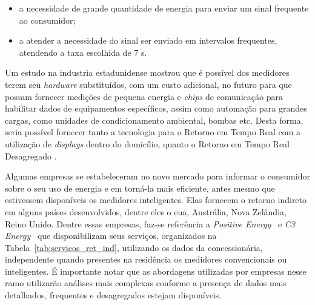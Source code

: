 \begin{itemize}
\item a necessidade de grande quantidade de energia para enviar
um sinal frequente ao consumidor;
\item a atender a necessidade do sinal ser enviado em intervalos frequentes,
atendendo a taxa escolhida de 7 s.
\end{itemize}

Um estudo na industria estadunidense mostrou que é possível dos medidores terem
seu \emph{hardware} substituídos, com um custo adicional, no futuro para que
possam fornecer medições de pequena energia e \emph{chips} de comunicação para
habilitar dados de equipamentos específicos, assim como automação para grandes
cargas, como unidades de condicionamento ambiental, bombas etc. Desta forma,
seria possível fornecer tanto a tecnologia para o Retorno em Tempo Real com a
utilização de \emph{displays} dentro do domicílio, quanto o Retorno em Tempo
Real Desagregado \cite{aceee_2010_estudos_feedback}.

Algumas empresas se estabeleceram no novo mercado para informar o consumidor
sobre o seu uso de energia e em torná-la mais eficiente, antes mesmo que
estivessem disponíveis os medidores inteligentes.  Elas fornecem o retorno
indireto em alguns países desenvolvidos, dentre eles o \gls{eua}, Austrália,
Nova Zelândia, Reino Unido.  Dentre essas empresas, faz-se referência a
\emph{Positive Energy}~\cite{opower_site} e \emph{C3 Energy}~\cite{c3_site} que
disponibilizam seus serviços, organizados na Tabela~\ref{tab:servicos_ret_ind},
utilizando os dados da concessionária, independente quando presentes na
residência os medidores convencionais ou inteligentes.  É importante notar que
as abordagens utilizadas por empresas nesse ramo utilizarão análises mais
complexas conforme a presença de dados mais detalhados, frequentes e
desagregados estejam disponíveis.


